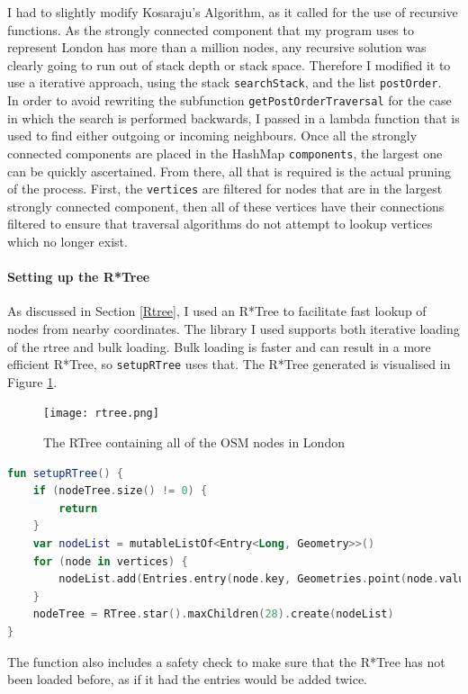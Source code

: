 \documentclass[11pt,twoside,a4paper]{report}
\begin{document}
I had to slightly modify Kosaraju's Algorithm\cite{wikipedia_2022}, as it called for the use of recursive functions. As the strongly connected component that my program uses to represent London has more than a million nodes, any recursive
solution was clearly going to run out of stack depth or stack space. Therefore I modified it to use a iterative approach, using the stack \texttt{searchStack}, and the list \texttt{postOrder}.\\ In order to avoid rewriting the subfunction \texttt{getPostOrderTraversal} for the case in which the search is performed backwards, I passed in a lambda function that is used to find either outgoing or incoming neighbours. 
Once all the strongly connected components are placed in the HashMap \texttt{components}, the largest one can be quickly ascertained. From there, all that is required is the actual pruning of the process.
First, the \texttt{vertices} are filtered for nodes that are in the largest strongly connected component, then all of these vertices have their connections filtered to ensure that traversal algorithms do not attempt to lookup vertices which no longer exist.
\paragraph{Setting up the R*Tree}
As discussed in Section \ref{Rtree}, I used an R*Tree to facilitate fast lookup of nodes from nearby coordinates. The library I used\cite{rtree} supports both iterative loading of the rtree and bulk loading. Bulk loading is faster and can result in a 
more efficient R*Tree, so \texttt{setupRTree} uses that. The R*Tree generated is visualised in Figure \ref{rvis}.
\begin{figure}[t]
\begin{center}
    \texttt{[image: rtree.png]}
\end{center}
\caption{The RTree containing all of the OSM nodes in London}
\label{rvis}
\end{figure}
\begin{lstlisting}[language=kotlin]
fun setupRTree() {
    if (nodeTree.size() != 0) {
        return
    }
    var nodeList = mutableListOf<Entry<Long, Geometry>>()
    for (node in vertices) {
        nodeList.add(Entries.entry(node.key, Geometries.point(node.value.longitude, node.value.latitude)))
    }
    nodeTree = RTree.star().maxChildren(28).create(nodeList)
}
\end{lstlisting}
The function also includes a safety check to make sure that the R*Tree has not been loaded before, as if it had the entries would be added twice. 
\newpage
\end{document}
